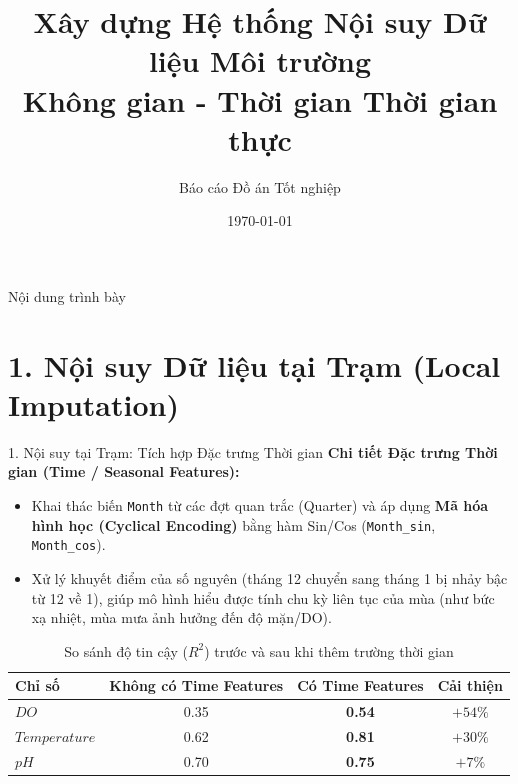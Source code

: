 \documentclass[aspectratio=169]{beamer}
\title[Nội suy Không gian - Thời gian]{Xây dựng Hệ thống Nội suy Dữ liệu Môi trường \\ Không gian - Thời gian Thời gian thực}
\author{Báo cáo Đồ án Tốt nghiệp}
\institute{Đại học Bách Khoa Hà Nội}
\date{\today}
\begin{document}
\begin{frame}
    \titlepage
\end{frame}

\begin{frame}{Nội dung trình bày}
    \tableofcontents
\end{frame}

\section{1. Nội suy Dữ liệu tại Trạm (Local Imputation)}

\begin{frame}{1. Nội suy tại Trạm: Tích hợp Đặc trưng Thời gian}
    \textbf{Chi tiết Đặc trưng Thời gian (Time / Seasonal Features):}
    \begin{itemize}
        \item Khai thác biến \texttt{Month} từ các đợt quan trắc (Quarter) và áp dụng \textbf{Mã hóa hình học (Cyclical Encoding)} bằng hàm Sin/Cos (\texttt{Month\_sin}, \texttt{Month\_cos}).
        \item Xử lý khuyết điểm của số nguyên (tháng 12 chuyển sang tháng 1 bị nhảy bậc từ 12 về 1), giúp mô hình hiểu được tính chu kỳ liên tục của mùa (như bức xạ nhiệt, mùa mưa ảnh hưởng đến độ mặn/DO).
    \end{itemize}

    \begin{table}[]
        \centering
        \caption{So sánh độ tin cậy ($R^2$) trước và sau khi thêm trường thời gian}
        \renewcommand{\arraystretch}{1.3}
        \begin{tabular}{lccc}
            \toprule
            \textbf{Chỉ số} & \textbf{Không có Time Features} & \textbf{Có Time Features} & \textbf{Cải thiện} \\
            \midrule
            $DO$            & 0.35                            & \textbf{0.54}             & $+54\%$            \\
            $Temperature$   & 0.62                            & \textbf{0.81}             & $+30\%$            \\
            $pH$            & 0.70                            & \textbf{0.75}             & $+7\%$             \\
            \bottomrule
        \end{tabular}
    \end{table}
\end{frame}
\end{document}
